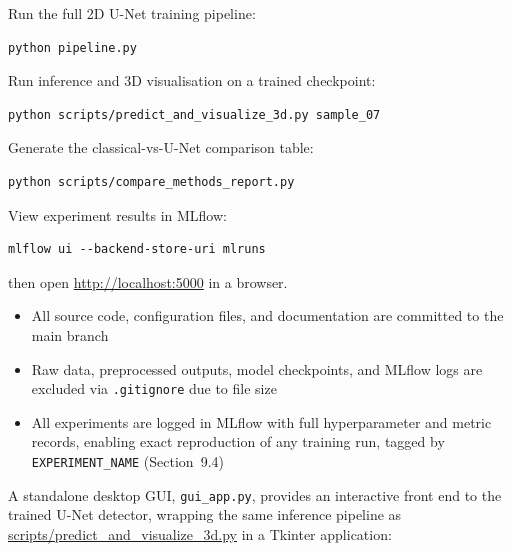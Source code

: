 Run the full 2D U-Net training pipeline:
\begin{verbatim}
python pipeline.py
\end{verbatim}

Run inference and 3D visualisation on a trained checkpoint:
\begin{verbatim}
python scripts/predict_and_visualize_3d.py sample_07
\end{verbatim}

Generate the classical-vs-U-Net comparison table:
\begin{verbatim}
python scripts/compare_methods_report.py
\end{verbatim}

View experiment results in MLflow:
\begin{verbatim}
mlflow ui --backend-store-uri mlruns
\end{verbatim}
then open \url{http://localhost:5000} in a browser.

\begin{itemize}
\item All source code, configuration files, and documentation are committed to the main branch
\item Raw data, preprocessed outputs, model checkpoints, and MLflow logs are excluded via
  \texttt{.gitignore} due to file size
\item All experiments are logged in MLflow with full hyperparameter and metric records, enabling
  exact reproduction of any training run, tagged by \texttt{EXPERIMENT\_NAME} (Section~9.4)
\end{itemize}

A standalone desktop GUI, \texttt{gui\_app.py}, provides an interactive front end to the trained U-Net
detector, wrapping the same inference pipeline as \url{scripts/predict_and_visualize_3d.py} in a
Tkinter application:

